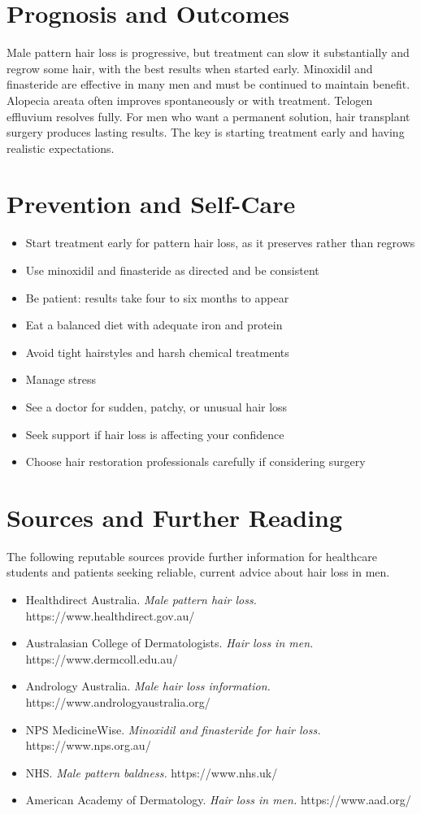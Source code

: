 \section*{Prognosis and Outcomes}
Male pattern hair loss is progressive, but treatment can slow it substantially and regrow some hair, with the best results when started early. Minoxidil and finasteride are effective in many men and must be continued to maintain benefit. Alopecia areata often improves spontaneously or with treatment. Telogen effluvium resolves fully. For men who want a permanent solution, hair transplant surgery produces lasting results. The key is starting treatment early and having realistic expectations.

\section*{Prevention and Self-Care}
\begin{itemize}
    \item Start treatment early for pattern hair loss, as it preserves rather than regrows
    \item Use minoxidil and finasteride as directed and be consistent
    \item Be patient: results take four to six months to appear
    \item Eat a balanced diet with adequate iron and protein
    \item Avoid tight hairstyles and harsh chemical treatments
    \item Manage stress
    \item See a doctor for sudden, patchy, or unusual hair loss
    \item Seek support if hair loss is affecting your confidence
    \item Choose hair restoration professionals carefully if considering surgery
\end{itemize}

\section*{Sources and Further Reading}
The following reputable sources provide further information for healthcare students and patients seeking reliable, current advice about hair loss in men.

\begin{itemize}
    \item Healthdirect Australia. \textit{Male pattern hair loss.} https://www.healthdirect.gov.au/
    \item Australasian College of Dermatologists. \textit{Hair loss in men.} https://www.dermcoll.edu.au/
    \item Andrology Australia. \textit{Male hair loss information.} https://www.andrologyaustralia.org/
    \item NPS MedicineWise. \textit{Minoxidil and finasteride for hair loss.} https://www.nps.org.au/
    \item NHS. \textit{Male pattern baldness.} https://www.nhs.uk/
    \item American Academy of Dermatology. \textit{Hair loss in men.} https://www.aad.org/
\end{itemize}
